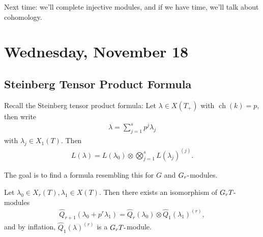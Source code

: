 Next time: we'll complete injective modules, and if we have time, we'll
talk about cohomology.

\hypertarget{wednesday-november-18}{%
\section{Wednesday, November 18}\label{wednesday-november-18}}

\hypertarget{steinberg-tensor-product-formula}{%
\subsection{Steinberg Tensor Product
Formula}\label{steinberg-tensor-product-formula}}

Recall the Steinberg tensor product formula: Let \(\lambda \in X(T_+)\)
with \(\operatorname{ch}(k) = p\), then write
\begin{align*}  
\lambda = \sum_{j=1}^s p^j \lambda_j
\end{align*}
with \(\lambda_j \in X_1(T)\). Then
\begin{align*}  
L(\lambda) = L(\lambda_0) \otimes\bigotimes_{j=1}^s L(\lambda_j)^{(j)}
.\end{align*}

The goal is to find a formula resembling this for \(G\) and
\(G_r{\hbox{-}}\)modules.

\begin{proposition}[?]

Let \(\lambda_0 \in X_r(T), \lambda_1 \in X(T)\). Then there exists an
isomorphism of \(G_r T{\hbox{-}}\)modules
\begin{align*}  
\widehat{Q}_{r+1} (\lambda_0 + p^r \lambda_1) = \widehat{Q}_r (\lambda_0) \otimes\widehat{Q}_1(\lambda_1)^{(r)}
,\end{align*}
and by inflation, \(\widehat{Q}_1(\lambda)^{(r)}\) is a
\(G_r T{\hbox{-}}\)module.

\end{proposition}

